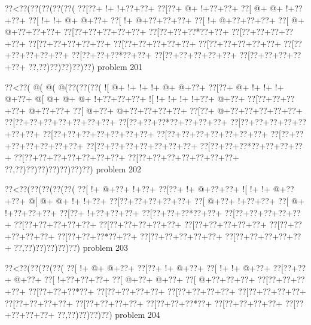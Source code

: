 \vbox{\vbox{\goo
\0??<\0??(\0??(\0??(\0??(\0??(
\0??[\0??+\- !+\- !+\0??+\0??+
\0??[\0??+\- @+\- !+\0??+\0??+
\0??[\- @+\- @+\- !+\0??+\0??+
\0??[\- !+\- !+\- @+\- @+\0??+
\0??[\- !+\- @+\0??+\0??+\0??+
\0??[\- !+\- @+\0??+\0??+\0??+
\0??[\- @+\- @+\0??+\0??+\0??+
\0??[\0??+\0??+\0??+\0??+\0??+
\0??[\0??+\0??+\0??*\0??+\0??+
\0??[\0??+\0??+\0??+\0??+\0??+
\0??[\0??+\0??+\0??+\0??+\0??+
\0??[\0??+\0??+\0??+\0??+\0??+
\0??[\0??+\0??+\0??+\0??+\0??+
\0??[\0??+\0??+\0??+\0??+\0??+
\0??[\0??+\0??+\0??*\0??+\0??+
\0??[\0??+\0??+\0??+\0??+\0??+
\0??[\0??+\0??+\0??+\0??+\0??+
\0??,\0??)\0??)\0??)\0??)\0??)
}
\hfil problem 201\hfil\break
}

\vbox{\vbox{\goo
\0??<\0??(\- @(\- @(\- @(\0??(\0??(\0??(
\- ![\- @+\- !+\- !+\- !+\- @+\- @+\0??+
\0??[\0??+\- @+\- !+\- !+\- !+\- @+\0??+
\- @[\- @+\- @+\- @+\- !+\0??+\0??+\0??+
\- ![\- !+\- !+\- !+\- !+\0??+\- @+\0??+
\0??[\0??+\0??+\0??+\0??+\- @+\0??+\0??+
\0??[\- @+\0??+\- @+\0??+\0??+\0??+\0??+
\0??[\0??+\- @+\0??+\0??+\0??+\0??+\0??+
\0??[\0??+\0??+\0??+\0??+\0??+\0??+\0??+
\0??[\0??+\0??+\0??*\0??+\0??+\0??+\0??+
\0??[\0??+\0??+\0??+\0??+\0??+\0??+\0??+
\0??[\0??+\0??+\0??+\0??+\0??+\0??+\0??+
\0??[\0??+\0??+\0??+\0??+\0??+\0??+\0??+
\0??[\0??+\0??+\0??+\0??+\0??+\0??+\0??+
\0??[\0??+\0??+\0??+\0??+\0??+\0??+\0??+
\0??[\0??+\0??+\0??*\0??+\0??+\0??+\0??+
\0??[\0??+\0??+\0??+\0??+\0??+\0??+\0??+
\0??[\0??+\0??+\0??+\0??+\0??+\0??+\0??+
\0??,\0??)\0??)\0??)\0??)\0??)\0??)\0??)
}
\hfil problem 202\hfil\break
}

\vbox{\vbox{\goo
\0??<\0??(\0??(\0??(\0??(\0??(
\0??[\- !+\- @+\0??+\- !+\0??+
\0??[\0??+\- !+\- @+\0??+\0??+
\- ![\- !+\- !+\- @+\0??+\0??+
\- @[\- @+\- @+\- !+\- !+\0??+
\0??[\0??+\0??+\0??+\0??+\0??+
\0??[\- @+\0??+\- !+\0??+\0??+
\0??[\- @+\- !+\0??+\0??+\0??+
\0??[\0??+\- !+\0??+\0??+\0??+
\0??[\0??+\0??+\0??*\0??+\0??+
\0??[\0??+\0??+\0??+\0??+\0??+
\0??[\0??+\0??+\0??+\0??+\0??+
\0??[\0??+\0??+\0??+\0??+\0??+
\0??[\0??+\0??+\0??+\0??+\0??+
\0??[\0??+\0??+\0??+\0??+\0??+
\0??[\0??+\0??+\0??*\0??+\0??+
\0??[\0??+\0??+\0??+\0??+\0??+
\0??[\0??+\0??+\0??+\0??+\0??+
\0??,\0??)\0??)\0??)\0??)\0??)
}
\hfil problem 203\hfil\break
}

\vbox{\vbox{\goo
\0??<\0??(\0??(\0??(\0??(
\0??[\- !+\- @+\- @+\0??+
\0??[\0??+\- !+\- @+\0??+
\0??[\- !+\- !+\- @+\0??+
\0??[\0??+\0??+\- @+\0??+
\0??[\- !+\0??+\0??+\0??+
\0??[\- @+\0??+\- @+\0??+
\0??[\- @+\0??+\0??+\0??+
\0??[\0??+\0??+\0??+\0??+
\0??[\0??+\0??+\0??*\0??+
\0??[\0??+\0??+\0??+\0??+
\0??[\0??+\0??+\0??+\0??+
\0??[\0??+\0??+\0??+\0??+
\0??[\0??+\0??+\0??+\0??+
\0??[\0??+\0??+\0??+\0??+
\0??[\0??+\0??+\0??*\0??+
\0??[\0??+\0??+\0??+\0??+
\0??[\0??+\0??+\0??+\0??+
\0??,\0??)\0??)\0??)\0??)
}
\hfil problem 204\hfil\break
}

